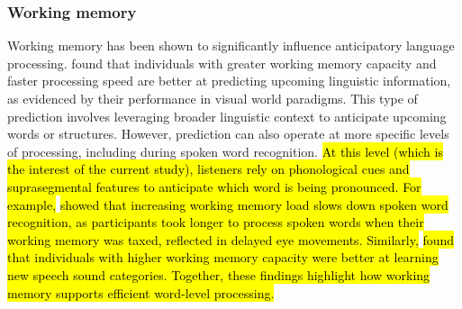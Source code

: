 \subsubsection{Working memory}
Working memory has been shown to significantly influence anticipatory language processing. \cite{Huettig2016} found that individuals with greater working memory capacity and faster processing speed are better at predicting upcoming linguistic information, as evidenced by their performance in visual world paradigms. This type of prediction involves leveraging broader linguistic context to anticipate upcoming words or structures. However, prediction can also operate at more specific levels of processing, including during spoken word recognition. \hl{At this level (which is the interest of the current study), listeners rely on phonological cues and suprasegmental features to anticipate which word is being pronounced. For example,} \cite{hadar_2016} \hl{showed that increasing working memory load slows down spoken word recognition, as participants took longer to process spoken words when their working memory was taxed, reflected in delayed eye movements. Similarly,}\cite{mchaney_et_al_2021_workingmemory} \hl{found that individuals with higher working memory capacity were better at learning new speech sound categories. Together, these findings highlight how working memory supports efficient word-level processing.}

